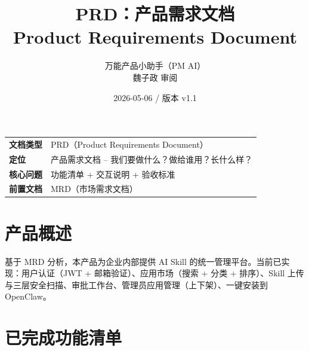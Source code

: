 \documentclass[11pt,a4paper]{article}
\title{\textbf{PRD：产品需求文档}\\[0.5em]\large Product Requirements Document}
\author{万能产品小助手（PM AI）\\魏子政 审阅}
\date{2026-05-06 / 版本 v1.1}
\begin{document}
\maketitle

\begin{center}
\begin{tabular}{>{\bfseries}p{3cm} p{10cm}}
\toprule
文档类型 & PRD（Product Requirements Document） \\
定位 & 产品需求文档 -- 我们要做什么？做给谁用？长什么样？ \\
核心问题 & 功能清单 + 交互说明 + 验收标准 \\
前置文档 & MRD（市场需求文档） \\
\bottomrule
\end{tabular}
\end{center}

\vspace{1em}

\section{产品概述}

基于 MRD 分析，本产品为企业内部提供 AI Skill 的统一管理平台。当前已实现：用户认证（JWT + 邮箱验证）、应用市场（搜索 + 分类 + 排序）、Skill 上传与三层安全扫描、审批工作台、管理员应用管理（上下架）、一键安装到 OpenClaw。

\section{已完成功能清单}
\end{document}
